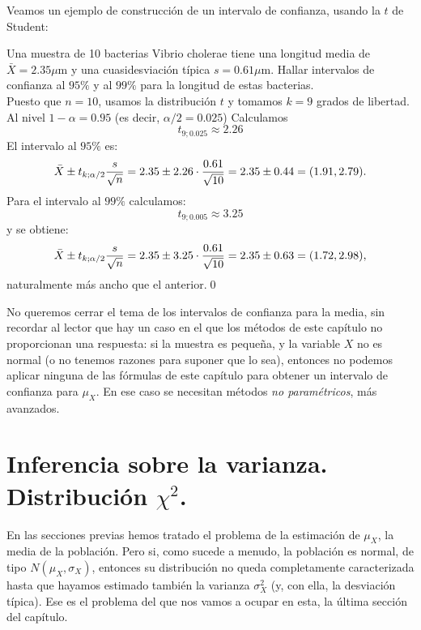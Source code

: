Veamos un ejemplo de construcción de un intervalo de confianza, usando la $t$
de Student:
\begin{ejemplo}
\label{cap06:ejem:IntConfMediaConTBacterias}
    Una muestra de 10 bacterias Vibrio cholerae tiene una longitud media de $\bar X=2.35\mu$m y una
    cuasidesviación típica $s=0.61\mu$m. Hallar intervalos de confianza al $95\%$ y al $99\%$ para
    la longitud de estas
    bacterias.\\[3mm]


    Puesto que $n=10$, usamos la distribución $t$ y tomamos $k=9$ grados de libertad. Al nivel $1-\alpha=0.95$ (es decir, $\alpha/2=0.025$) Calculamos
    \[t_{9;0.025}\approx 2.26\]
    El intervalo al $95\%$ es:
    \[\bar X \pm \textcolor{black}{\mbox{$t_{k;\alpha/2}$}}\dfrac{s}{\sqrt{n}}=2.35\pm 2.26\cdot\dfrac{0.61}{\sqrt{10}}=2.35\pm 0.44 = (1.91, 2.79).\]
    Para el intervalo al $99\%$ calculamos:
    \[t_{9;0.005}\approx 3.25\]
    y se obtiene:
    \[\bar X \pm \textcolor{black}{\mbox{$t_{k;\alpha/2}$}}\dfrac{s}{\sqrt{n}}=2.35\pm 3.25\cdot\dfrac{0.61}{\sqrt{10}}=2.35\pm 0.63=(1.72,2.98),\]
    naturalmente más ancho que el anterior.\qed
\end{ejemplo}

No queremos cerrar el tema de los intervalos de confianza para la media, sin
recordar al lector que hay un caso en el que los métodos de este capítulo no
proporcionan una respuesta: si la muestra es pequeña, y la variable $X$ no es
normal (o no tenemos razones para suponer que lo sea), entonces no podemos
aplicar ninguna de las fórmulas de este capítulo para obtener un intervalo de
confianza para $\mu_X$. En ese caso se necesitan métodos {\em no paramétricos},
más avanzados.

\section{Inferencia sobre la varianza. Distribución $\chi^2$.}
\label{cap06:sec:InferenciaVarianzaDistribucionChi2}

En las secciones previas hemos tratado el problema de la estimación de $\mu_X$,
la media de la población. Pero si, como sucede a menudo, la población es
normal, de tipo $N(\mu_X,\sigma_X)$, entonces su distribución no queda
completamente caracterizada hasta que hayamos estimado también la varianza
$\sigma^2_X$ (y, con ella, la desviación típica). Ese es el problema del que
nos vamos a ocupar en esta, la última sección del capítulo.

